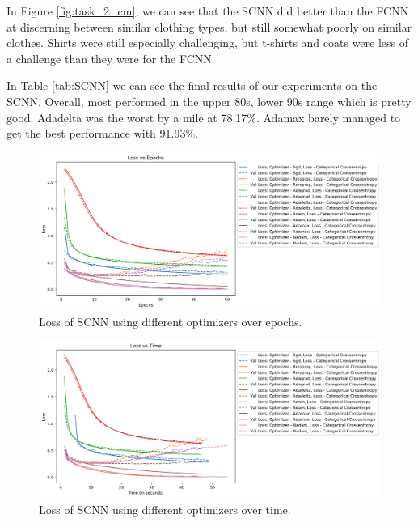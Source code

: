 \documentclass[12pt]{article}
\begin{document}
In Figure \ref{fig:task_2_cm}, we can see that the SCNN did better than the FCNN
 at discerning between similar clothing types, but still somewhat poorly on similar clothes.
Shirts were still especially challenging, but t-shirts and coats were less of a challenge than they were for the FCNN.

In Table \ref{tab:SCNN} we can see the final results of our experiments on the SCNN.
Overall, most performed in the upper 80s, lower 90s range which is pretty good.
Adadelta was the worst by a mile at 78.17\%.
Adamax barely managed to get the best performance with 91.93\%.

\begin{figure}
  \centering
  \includegraphics[width=\linewidth]{task_2_loss_epochs.png}
  \caption{Loss of SCNN using different optimizers over epochs.}
  \label{fig:task_2_loss_epochs}
\end{figure}

\begin{figure}
  \centering
  \includegraphics[width=\linewidth]{task_2_loss_time.png}
  \caption{Loss of SCNN using different optimizers over time.}
  \label{fig:task_2_loss_time}
\end{figure}
\end{document}
